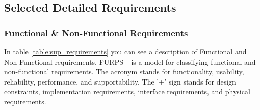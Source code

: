 \subsection{Selected Detailed Requirements}

\subsubsection{Functional \& Non-Functional Requirements}
In table \ref{table:sup_requirements} you can see a description of Functional and
Non-Functional requirements. 
FURPS+ is a model for classifying functional and non-functional requirements.
The acronym stands for functionality, usability, reliability, performance, and supportability.
The '+' sign stands for design constraints, implementation requirements,
interface requirements, and physical requirements.


